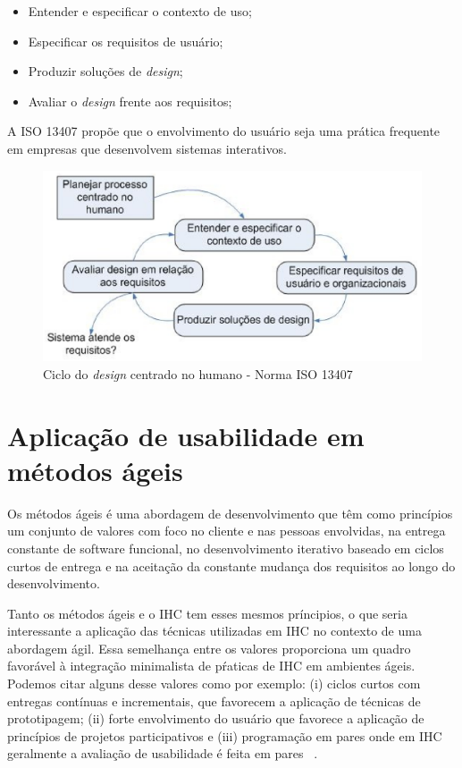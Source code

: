 \begin{itemize}
\item Entender e especificar o contexto de uso;
\item Especificar os requisitos de usuário;
\item Produzir soluções de \emph{design};
\item Avaliar o \emph{design} frente aos requisitos;
\end{itemize}

A ISO 13407 propõe que o envolvimento do usuário seja uma prática frequente em empresas que desenvolvem sistemas interativos.

\begin{figure}[h]
    \centering
    \includegraphics[keepaspectratio=true,scale=0.60]
      {figuras/ciclo_iso13407.eps}
    \caption{Ciclo do \emph{design} centrado no humano - Norma ISO 13407}
    \label{ciclo_iso13407}
\end{figure}




\section{Aplicação de usabilidade em métodos ágeis}
	
	Os métodos ágeis é uma abordagem de desenvolvimento que têm como princípios um conjunto de valores com foco no cliente e nas pessoas envolvidas, na entrega constante de software funcional, no desenvolvimento iterativo baseado em ciclos curtos de entrega e na aceitação da constante mudança dos requisitos ao longo do desenvolvimento. 

	Tanto os métodos ágeis e o IHC tem esses mesmos príncipios, o que seria interessante a aplicação das técnicas utilizadas em IHC no contexto de uma abordagem ágil. Essa semelhança entre os valores proporciona um quadro favorável à integração minimalista de pŕaticas de IHC em ambientes ágeis. Podemos citar alguns desse valores como por exemplo: (i) ciclos curtos com entregas contínuas e incrementais, que favorecem a aplicação de técnicas de prototipagem; (ii) forte envolvimento do usuário que favorece a aplicação de princípios de projetos participativos e (iii) programação em pares onde em IHC geralmente a avaliação de usabilidade é feita em pares ~\cite{barbosa2008estrategia}. 

